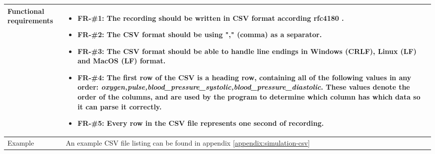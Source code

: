 \documentclass[a4paper]{article}
\begin{document}
\begin{longtable}[l]{ | >{\columncolor{vu-grey-50}}m{110pt} | m{300pt} | }
    Functional requirements &
    \begin{itemize}
        \item \textbf{FR-\#1}: The recording should be written in CSV format according \textbf{rfc4180} \cite{rfc4180}.
        \item \textbf{FR-\#2}: The CSV format should be using "," (comma) as a separator.
        \item \textbf{FR-\#3}: The CSV format should be able to handle line endings in Windows (CRLF), Linux (LF) and MacOS (LF) format.
        \item \textbf{FR-\#4}: The first row of the CSV is a heading row, containing all of the following values in any order: \textit{oxygen,pulse,blood\_pressure\_systolic,blood\_pressure\_diastolic}. These values denote the order of the columns, and are used by the program to determine which column has which data so it can parse it correctly.
        \item \textbf{FR-\#5}: Every row in the CSV file represents one second of recording.
    \end{itemize}
    \\ \hline
    
    Example &
    An example CSV file listing can be found in appendix \ref{appendix:simulation-csv}
    \\ \hline
\end{longtable}



\clearpage
\end{document}

